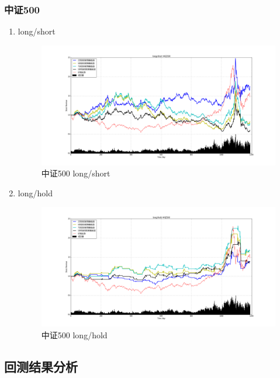 \documentclass[12pt,a4paper]{article}
\begin{document}
\subsubsection{中证500}
\begin{enumerate}
\item long/short 
\begin{figure}[H]
	\centering
	\includegraphics[width=1.0\textwidth]{img_r_10/zz500.png}
	\caption{中证500 long/short }
\end{figure}
\item long/hold 
\begin{figure}[H]
	\centering
	\includegraphics[width=1.0\textwidth]{img_r_10/zz500_1.png}
	\caption{中证500 long/hold}
\end{figure}
\end{enumerate}


\subsection{回测结果分析}
\end{document}
